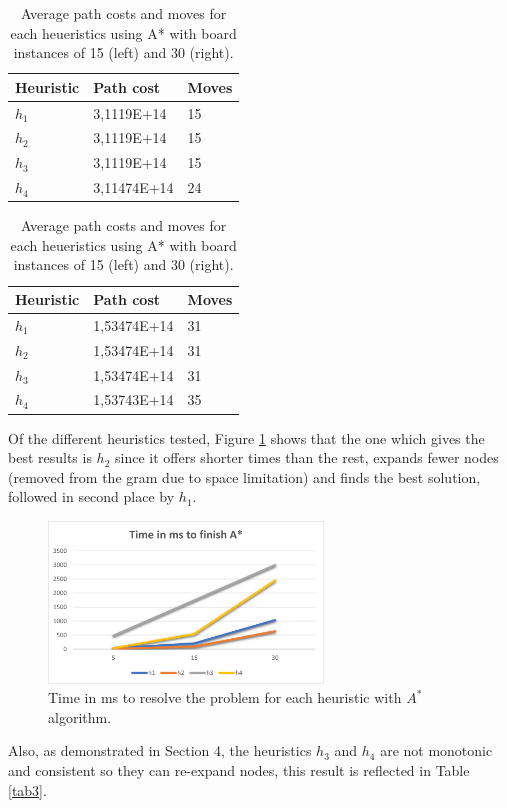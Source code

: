 \documentclass[runningheads]{llncs}
\begin{document}
\begin{table}[!htb]
    \caption{Average path costs and moves for each heueristics using A* with board instances of 15 (left) and 30 (right).}\label{tab1}
    \begin{minipage}{.5\linewidth}
      \centering
      \begin{tabular}{|l|l|l|}
        \hline
        Heuristic & Path cost & Moves\\
        \hline
        $h_1$ & 3,1119E+14 & 15\\
        $h_2$ & 3,1119E+14 & 15\\
        $h_3$ & 3,1119E+14 & 15\\
        $h_4$ & 3,11474E+14 & 24\\
        \hline
        \end{tabular}
    \end{minipage}%
    \begin{minipage}{.5\linewidth}
      \centering
        \begin{tabular}{|l|l|l|}
            \hline
            Heuristic & Path cost & Moves\\
            \hline
            $h_1$ & 1,53474E+14    & 31\\
            $h_2$ & 1,53474E+14    & 31\\
            $h_3$ & 1,53474E+14    & 31\\
            $h_4$ & 1,53743E+14    & 35\\
            \hline
            \end{tabular}
    \end{minipage} 
\end{table}

Of the different heuristics tested, Figure \ref{fig2} shows that the one which gives the best results is $h_2$ since it offers shorter times than the rest,
expands fewer nodes (removed from the gram due to space limitation) and finds the best solution, followed in second place by $h_1$.

\begin{figure}
    \centering
    \includegraphics[width=0.65\textwidth]{seconds_A.png}
    \caption{Time in ms to resolve the problem for each heuristic with $A^*$ algorithm.} \label{fig2}
\end{figure}
Also, as demonstrated in Section 4, the heuristics $h_3$ and $h_4$ are not monotonic and consistent so they can re-expand nodes, this result is reflected in Table \ref{tab3}.
\end{document}
